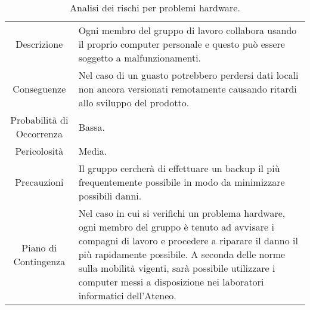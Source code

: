 \begin{table} [H]
    \begin{tabular}{|c | p{10cm}|}
        \rowcolor{darkblue}
    \hline
    \multicolumn{2}{|c|}{\textcolor{white}{\textbf{RT2 - Problemi Hardware}}} \\
    \hline
     Descrizione & Ogni membro del gruppo di lavoro collabora usando il proprio computer personale e questo può essere soggetto a malfunzionamenti.\\ 
     \hline
     Conseguenze & Nel caso di un guasto potrebbero perdersi dati locali non ancora versionati remotamente causando ritardi allo sviluppo del prodotto.\\
     \hline
     Probabilità di Occorrenza & Bassa.\\
     \hline
     Pericolosità & Media.\\
     \hline
     Precauzioni & Il gruppo cercherà di effettuare un backup il più frequentemente possibile in modo da minimizzare possibili danni.\\  
     \hline
     Piano di Contingenza & Nel caso in cui si verifichi un problema hardware, ogni membro del gruppo è tenuto ad avvisare i compagni di lavoro e procedere a riparare il danno il più rapidamente possibile. A seconda delle norme sulla mobilità vigenti, sarà possibile utilizzare i computer messi a disposizione nei laboratori informatici dell'Ateneo.\\ 
     \hline
    \end{tabular}
    \caption{\label{tab:RT2}Analisi dei rischi per problemi hardware.}
    \end{table}


